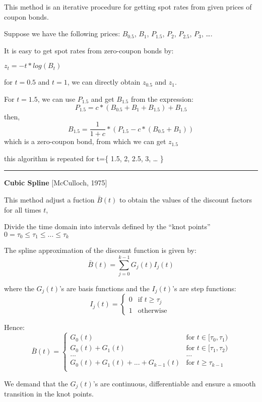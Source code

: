 \documentclass[letterpaper,10pt,english]{/anaconda/lib/python2.7/site-packages/sphinx/texinputs/sphinxhowto}
\begin{document}
This method is an iterative procedure for getting spot rates from given
prices of coupon bonds.

Suppose we have the following prices: $B_{0.5}$, $B_{1}$, $P_{1.5}$,
$P_{2}$, $P_{2.5}$, $P_{3}$, \ldots{}.

It is easy to get spot rates from zero-coupon bonds by:

$z_t = -t * log(B_t)$

for $t=0.5$ and $t=1$, we can directly obtain $z_{0.5}$ and $z_{1}$.

For $t=1.5$, we can use $P_{1.5}$ and get $B_{1.5}$ from the expression:
\[ P_{1.5} = c * (B_{0.5}+B_{1}+B_{1.5}) + B_{1.5}\] then,
\[ B_{1.5} = \frac{1}{1+c} * ( P_{1.5} - c * (B_{0.5}+B_{1})) \] which
is a zero-coupon bond, from which we can get $z_{1.5}$

this algorithm is repeated for t=\{ 1.5, 2, 2.5, 3, \ldots{} \}

\begin{center}\rule{3in}{0.4pt}\end{center}

\textbf{Cubic Spline} {[}McCulloch, 1975{]}

This method adjust a fuction $\bar{B}(t)$ to obtain the values of the
discount factors for all times $t$,

Divide the time domain into intervals defined by the ``knot points''
$0 = \tau_{0} \leq \tau_{1} \leq ... \leq \tau_{k}$

The spline approximation of the discount function is given by:
\[\bar{B}(t)=\sum\limits_{j=0}^{k-1} G_j(t) I_j(t)\]

where the $G_j(t)$'s are basis functions and the $I_j(t)$'s are step
functions:
\[I_j(t) = \begin{cases} 0 & \mbox{if } t \geq \tau_j \\ 1 & \mbox{otherwise } \end{cases}\]

Hence:
\[\bar{B}(t) = \begin{cases} G_{0}(t) & \mbox{for } t \in[\tau_0,\tau_1) \\ G_{0}(t)+G_{1}(t) & \mbox{for } t \in[\tau_1,\tau_2) \\ ... & ... \\ G_{0}(t)+G_{1}(t)+...+G_{k-1}(t) & \mbox{for } t \geq \tau_{k-1} \\ \end{cases}\]

We demand that the $G_j(t)$'s are continuous, differentiable and ensure
a smooth transition in the knot points.
\end{document}
